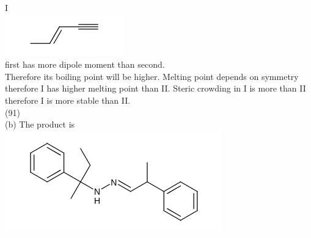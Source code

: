 \documentclass[10pt]{article}
\begin{document}
I\\
\includegraphics{smile-fffb677e483f40aa2c26bfb968fb42a6a500205f}\\
first has more dipole moment than second.\\
Therefore its boiling point will be higher. Melting point depends on symmetry therefore I has higher melting point than II. Steric crowding in I is more than II therefore I is more stable than II.\\
(91)\\
(b) The product is\\
\includegraphics{smile-077bcb03bca3ecd8b9af727b0144b10fb768df32}
\end{document}
